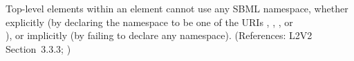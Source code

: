 Top-level elements within an  element cannot use any SBML
namespace, whether explicitly (by declaring the namespace to be one of the
URIs ,
, 
, or\\
), or implicitly (by failing
to declare any namespace).  (References: L2V2 Section~3.3.3; )

